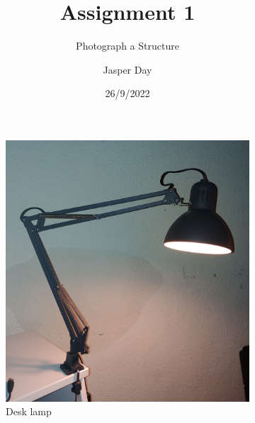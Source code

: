\documentclass[
]{article}
\title{Assignment 1}
\subtitle{Photograph a Structure}
\author{Jasper Day}
\date{26/9/2022}
\begin{document}
\maketitle

\leavevmode{}%

\begin{figure}
    \centering
    \begin{subfigure}[b]{0.45\textwidth}
    \centering
    \includegraphics[width=\textwidth,height=\textheight]{Images/A1_Lamp_Picture_Rotated.jpg}
    \caption{Desk lamp}
    \end{subfigure}
    \hfill
    \begin{subfigure}[b]{0.45\textwidth}
    \centering

\end{subfigure}
\end{figure}
\end{document}
